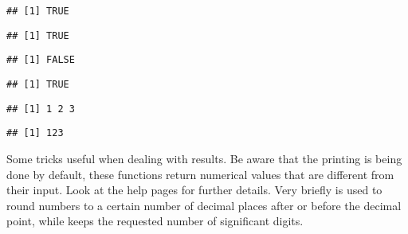 \documentclass[paper=a4,10pt,div=17,headsepline,BCOR=12mm,twoside,open=right]{scrbook}\usepackage{knitr}
\begin{document}
\begin{knitrout}
\begin{kframe}
\begin{alltt}
\hlstd{(}\hlstd{)}
\end{alltt}
\begin{verbatim}
## [1] TRUE
\end{verbatim}
\begin{alltt}
\hlstd{(}\hlstd{)}
\end{alltt}
\begin{verbatim}
## [1] TRUE
\end{verbatim}
\begin{alltt}
\hlstd{(}\hlstd{)}
\end{alltt}
\begin{verbatim}
## [1] FALSE
\end{verbatim}
\begin{alltt}
\hlstd{(}\hlopt{-}\hlstd{)}
\end{alltt}
\begin{verbatim}
## [1] TRUE
\end{verbatim}
\end{kframe}
\end{knitrout}

\begin{knitrout}\footnotesize
{}\color{fgcolor}\begin{kframe}
\begin{alltt}
 \hlkwb{<-} \hlstd{(}\hlstd{,} \hlstd{,} \hlstd{)}
 \hlkwb{<-} 
\end{alltt}
\begin{verbatim}
## [1] 1 2 3
\end{verbatim}
\begin{alltt}
\end{alltt}
\begin{verbatim}
## [1] 123
\end{verbatim}
\end{kframe}
\end{knitrout}

Some tricks useful when dealing with results. Be aware that the printing is being done by default, these functions return numerical values that are different from their input. Look at the help pages for further details. Very briefly  is used to round numbers to a certain number of decimal places after or before the decimal point, while  keeps the requested number of significant digits.
\end{document}
